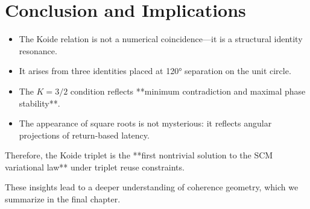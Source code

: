 \section{Conclusion and Implications}

\begin{itemize}
    \item The Koide relation is not a numerical coincidence—it is a structural identity resonance.
    \item It arises from three identities placed at 120° separation on the unit circle.
    \item The $K = 3/2$ condition reflects **minimum contradiction and maximal phase stability**.
    \item The appearance of square roots is not mysterious: it reflects angular projections of return-based latency.
\end{itemize}

\noindent Therefore, the Koide triplet is the **first nontrivial solution to the SCM variational law** under triplet reuse constraints.

These insights lead to a deeper understanding of coherence geometry, which we summarize in the final chapter.
